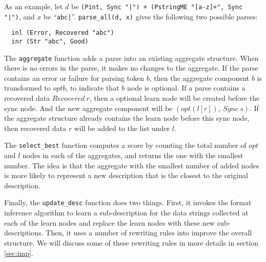 As an example, let $d$ be {\tt (Pint, Sync "|") + (PstringME "[a-z]+", Sync "|")}, 
and $x$ be ``\verb#abc|#''. {\tt parse\_all(d, x)} gives the following two possible parses:
{\small
\begin{verbatim}
  inl (Error, Recovered "abc")
  inr (Str "abc", Good)
\end{verbatim}
}

The {\tt aggregate} function adds a parse into an existing aggregate structure. When there is
no errors in the parse, it makes no changes to the aggregate. If the parse contains 
an error or failure for parsing token $b$, then the aggregate component 
$b$ is transformed to $opt b$, to indicate that $b$ node is optional. 
If a parse contains a recovered data $Recovered~ r$, then
a optional learn node will be created before the sync node. And the new aggregate component will be
$(opt (l [r]),~ Sync~ s)$. If the aggregate structure already contains the learn node before this
sync node, then recovered data $r$ will be added to the list under $l$.

The {\tt select\_best} function computes a score by counting the total number of $opt$ and $l$ nodes
in each of the aggregates, and returns the one with the smallest number. The idea is that the
aggregate with the smallest number of added nodes is more likely to represent a new description
that is the closest to the original description. 

Finally, the {\tt update\_desc} function does two things. First, it invokes the format inference
algorithm to learn a sub-description for the data strings collected at each of the learn nodes
and replace the learn nodes with these new sub-descriptions. Then, it uses a number of rewriting
rules into improve the overall structure. We will discuss some of these rewriting rules in more
details in section \ref{sec:imp}.



